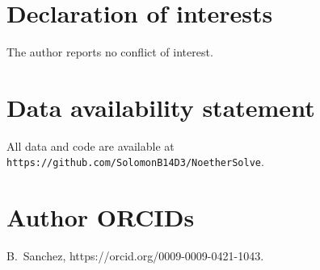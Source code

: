 \documentclass[rapids]{jfm}
\begin{document}
\section*{Declaration of interests}

The author reports no conflict of interest.

\section*{Data availability statement}

All data and code are available at \texttt{https://github.com/SolomonB14D3/NoetherSolve}.

\section*{Author ORCIDs}

B.~Sanchez, https://orcid.org/0009-0009-0421-1043.


\end{document}
